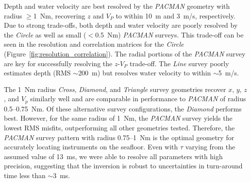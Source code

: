 Depth and water velocity are best resolved by the \textit{PACMAN} geometry with radius $\geq$1~Nm, recovering $z$ and $V_{P}$ to within 10~m and 3~m/s, respectively. Due to strong trade-offs, both depth and water velocity are poorly resolved by the \textit{Circle} as well as small ($<$0.5~Nm) \textit{PACMAN} surveys. This trade-off can be seen in the resolution and correlation matrices for the \textit{Circle} (Figure~\ref{fig:resolution_correlation}). The radial portions of the \textit{PACMAN} survey are key for successfully resolving the $z$-$V_P$ trade-off. The \textit{Line} survey poorly estimates depth (RMS $\sim$200~m) but resolves water velocity to within $\sim$5~m/s.

The 1~Nm radius \textit{Cross}, \textit{Diamond}, and \textit{Triangle} survey geometries recover $x$, $y$, $z$, and $V_{p}$ similarly well and are comparable in performance to \textit{PACMAN} of radius 0.5--0.75~Nm. Of these alternative survey configurations, the \textit{Diamond} performs best. However, for the same radius of 1~Nm, the \textit{PACMAN} survey yields the lowest RMS misfits, outperforming all other geometries tested. Therefore, the \textit{PACMAN} survey pattern with radius 0.75--1~Nm is the optimal geometry for accurately locating instruments on the seafloor. Even with $\tau$ varying from the assumed value of 13~ms, we were able to resolve all parameters with high precision, suggesting that the inversion is robust to uncertainties in turn-around time less than $\sim$3~ms.




